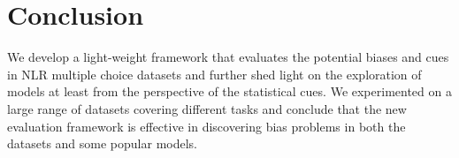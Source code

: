 \section{Conclusion}
We develop a light-weight 
framework that evaluates the potential biases and cues in NLR multiple choice 
datasets and further shed light on
the exploration of models at least from the perspective of the statistical cues. 
We experimented on a large range of datasets covering different tasks and 
conclude that the new evaluation framework is effective in discovering
bias problems in both the datasets and some popular models.
